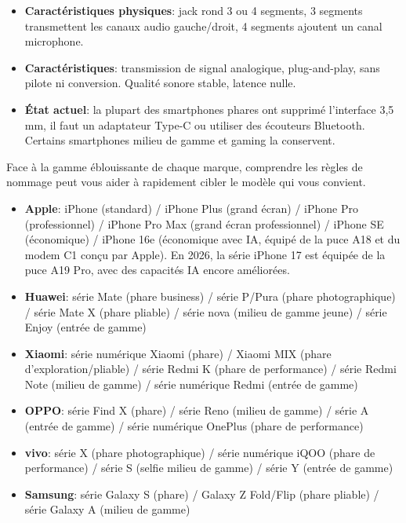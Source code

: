 
\begin{itemize}
  \item \textbf{Caractéristiques physiques}: jack rond 3 ou 4 segments, 3 segments transmettent les canaux audio gauche/droit, 4 segments ajoutent un canal microphone.
  \item \textbf{Caractéristiques}: transmission de signal analogique, plug-and-play, sans pilote ni conversion. Qualité sonore stable, latence nulle.
  \item \textbf{État actuel}: la plupart des smartphones phares ont supprimé l'interface 3,5 mm, il faut un adaptateur Type-C ou utiliser des écouteurs Bluetooth. Certains smartphones milieu de gamme et gaming la conservent.
\end{itemize}


Face à la gamme éblouissante de chaque marque, comprendre les règles de nommage peut vous aider à rapidement cibler le modèle qui vous convient.


\begin{itemize}
  \item \textbf{Apple}: iPhone (standard) / iPhone Plus (grand écran) / iPhone Pro (professionnel) / iPhone Pro Max (grand écran professionnel) / iPhone SE (économique) / iPhone 16e (économique avec IA, équipé de la puce A18 et du modem C1 conçu par Apple). En 2026, la série iPhone 17 est équipée de la puce A19 Pro, avec des capacités IA encore améliorées.
  \item \textbf{Huawei}: série Mate (phare business) / série P/Pura (phare photographique) / série Mate X (phare pliable) / série nova (milieu de gamme jeune) / série Enjoy (entrée de gamme)
  \item \textbf{Xiaomi}: série numérique Xiaomi (phare) / Xiaomi MIX (phare d'exploration/pliable) / série Redmi K (phare de performance) / série Redmi Note (milieu de gamme) / série numérique Redmi (entrée de gamme)
  \item \textbf{OPPO}: série Find X (phare) / série Reno (milieu de gamme) / série A (entrée de gamme) / série numérique OnePlus (phare de performance)
  \item \textbf{vivo}: série X (phare photographique) / série numérique iQOO (phare de performance) / série S (selfie milieu de gamme) / série Y (entrée de gamme)
  \item \textbf{Samsung}: série Galaxy S (phare) / Galaxy Z Fold/Flip (phare pliable) / série Galaxy A (milieu de gamme)
\end{itemize}

